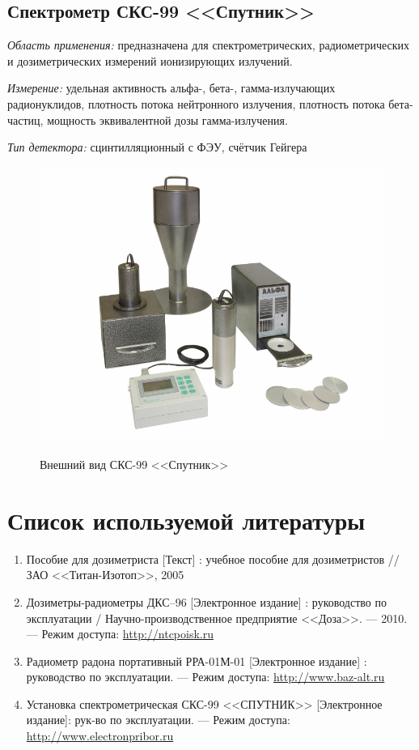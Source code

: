 \documentclass[14pt,pscyr,titlepage]{hedreport}
\begin{document}
	\pagebreak

	\subsection{Спектрометр СКС-99 <<Спутник>>}
		\emph{Область применения:} предназначена для спектрометрических, 
			радиометрических и дозиметрических измерений ионизирующих 
			излучений.

		\emph{Измерение:} удельная активность альфа-, бета-, гамма-излучающих 
			радионуклидов,  плотность потока нейтронного излучения, плотность 
			потока бета-частиц, мощность эквивалентной дозы гамма-излучения.

		\emph{Тип детектора:} сцинтилляционный с ФЭУ, счётчик Гейгера

		\begin{figure}[h!]
			\center
			\includegraphics[width=.8\textwidth]{CKC-99} \\
			\caption{Внешний вид СКС-99 <<Спутник>>}
		\end{figure}

	\pagebreak

	\section{Список используемой литературы}
	\begin{enumerate}\itemsep-2pt
		\item Пособие для дозиметриста [Текст] : учебное пособие для 
			дозиметристов // ЗАО <<Титан-Изотоп>>, 2005
		\item Дозиметры-радиометры ДКС–96 [Электронное издание] : руководство 
			по эксплуатации / Научно-производственное предприятие 
			<<Доза>>. --- 2010. --- Режим доступа: 
        	\href{http://ntcpoisk.ru/d/350762/d/dozimetri_radiometridks96.pdf}
        		{http://ntcpoisk.ru}  
        \item Радиометр радона портативный РРА-01М-01 [Электронное издание] : 
        	руководство по эксплуатации. --- Режим доступа:
        	\href{http://www.baz-alt.ru/userfiles/files/sks.pdf}
        		{http://www.baz-alt.ru}  
        \item Установка спектрометрическая СКС-99 <<СПУТНИК>> 
			[Электронное издание]: рук-во по эксплуатации. --- Режим доступа: \\
			\href{http://www.electronpribor.ru/resources/docs/RE_PPA_01_01ispr.pdf}
				{http://www.electronpribor.ru}
	\end{enumerate}
\end{document}
